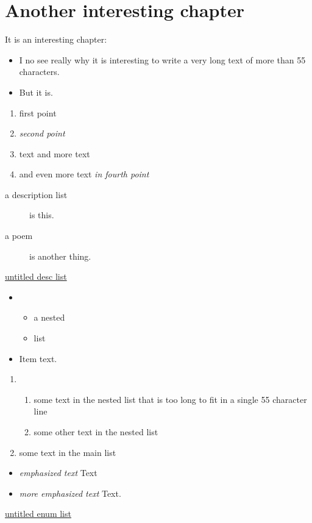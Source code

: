 \chapter{Another interesting chapter}
\label{s:2}
It is an interesting chapter:
\begin{itemize}
\item I no see really why it is interesting to write a very long text of more than
55 characters.
\item But it is.
\end{itemize}
\begin{enumerate}
\item first point
\item \emph{second point}
\item text 
and more text
\item and even more text
\emph{in fourth point}
\end{enumerate}
\hypertarget{label3}{}\begin{description}
\item[a description list] is this.
\item[a poem] is another thing.
\end{description}
\hyperlink{label3}{untitled desc list}
\begin{itemize}
\item \begin{itemize}
\item a nested
\item list
\end{itemize}

\item Item text.
\end{itemize}
\hypertarget{label2}{}\begin{enumerate}
\item \begin{enumerate}
\item some text in the nested list that is too long to fit in a single 55 character line
\item some other text in the nested list
\end{enumerate}

\item some text in the main list
\end{enumerate}
\begin{itemize}
\item \emph{emphasized text}
Text
\item \emph{more emphasized text}
Text.
\end{itemize}
\hyperlink{label2}{untitled enum list}

